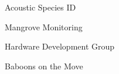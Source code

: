 \item Acoustic Species ID
\item Mangrove Monitoring
\item Hardware Development Group
\item Baboons on the Move
